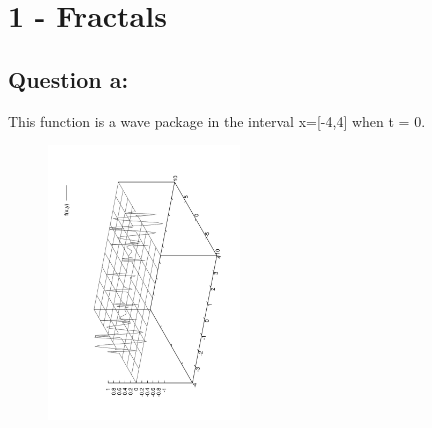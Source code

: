 \documentclass[twocolumn]{article}
\title{Lab#2\\Computational Physics I - Phys381}
\author{Guilherme Contesini 10140201 \\ Gerswin Magat 00325287}
\begin{document}
\maketitle

\newpage


\section{1 - Fractals}


\subsection{Question a:}
This function is a wave package in the interval x=[-4,4] when t = 0.
\begin{figure}[h!]

\begin{center}
\includegraphics[width=2in,angle=270]{a.pdf}
\label{fig1}
\end{center}

\end{figure}


\newpage

\end{document}
